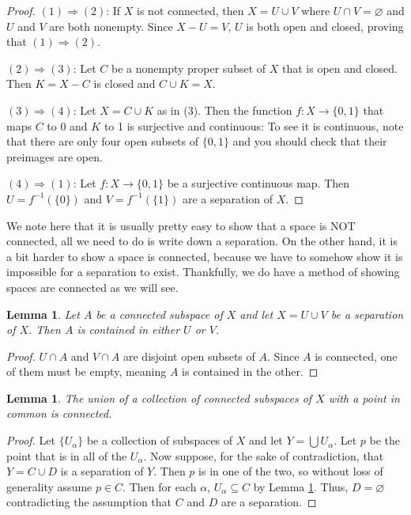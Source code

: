 \documentclass[a4paper]{article}
\newtheorem{lemma}[theorem]{Lemma}
\numberwithin{theorem}{section}
\begin{document}
\begin{proof}
$(1) \Rightarrow (2)$: If $X$ is not connected, then $X = U \cup V$ where $U \cap V = \varnothing$ and $U$ and $V$ are both nonempty. Since $X - U = V$, $U$ is both open and closed, proving that $(1) \Rightarrow (2)$.

$(2) \Rightarrow (3)$: Let $C$ be a nonempty proper subset of $X$ that is open and closed. Then $K = X - C$ is closed and $C \cup K = X$.

$(3) \Rightarrow (4)$: Let $X = C \cup K$ as in (3). Then the function $f:X \rightarrow \{0,1\}$ that maps $C$ to $0$ and $K$ to 1 is surjective and continuous: To see it is continuous, note that there are only four open subsets of $\{0,1\}$ and you should check that their preimages are open.

$(4) \Rightarrow (1)$: Let $f: X \rightarrow \{0,1\}$ be a surjective continuous map. Then $U = f^{-1}(\{0\})$ and $V = f^{-1}(\{1\})$ are a separation of $X$.

\end{proof}

We note here that it is usually pretty easy to show that a space is NOT connected, all we need to do is write down a separation. On the other hand, it is a bit harder to show a space is connected, because we have to somehow show it is impossible for a separation to exist. Thankfully, we do have a method of showing spaces are connected as we will see.

\begin{lemma} \label{lem}
Let $A$ be a connected subspace of $X$ and let $X = U \cup V$ be a separation of $X$. Then $A$ is contained in either $U$ or $V$.
\end{lemma}

\begin{proof}
$U \cap A$ and $V \cap A$ are disjoint open subsets of $A$. Since $A$ is connected, one of them must be empty, meaning $A$ is contained in the other.
\end{proof}

\begin{lemma} \label{lem2}
The union of a collection of connected subspaces of $X$ with a point in common is connected.
\end{lemma}
\begin{proof}
Let $\{U_\alpha\}$ be a collection of subspaces of $X$ and let $Y = \bigcup U_\alpha$. Let $p$ be the point that is in all of the $U_\alpha$. Now suppose, for the sake of contradiction, that $Y = C \cup D$ is a separation of $Y$. Then $p$ is in one of the two, so without loss of generality assume $p \in C$. Then for each $\alpha$, $U_\alpha \subseteq C$ by Lemma \ref{lem}. Thus, $D = \varnothing$ contradicting the assumption that $C$ and $D$ are a separation.
\end{proof}
\end{document}
